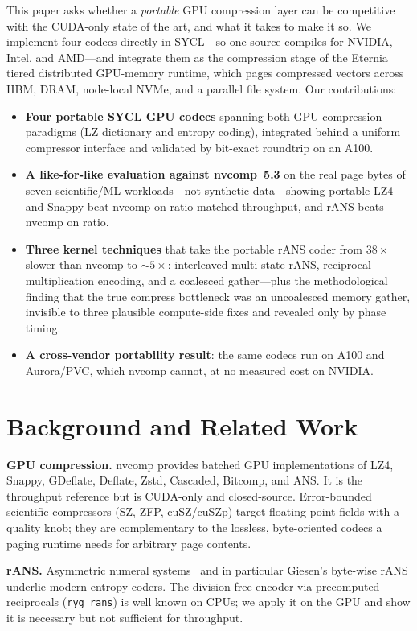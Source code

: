 \documentclass[sigconf,review,anonymous]{acmart}
\begin{document}
This paper asks whether a \emph{portable} GPU compression layer can be
competitive with the CUDA-only state of the art, and what it takes to make it so.
We implement four codecs directly in SYCL---so one source compiles for NVIDIA,
Intel, and AMD---and integrate them as the compression stage of the Eternia
tiered distributed GPU-memory runtime, which pages compressed vectors across
HBM, DRAM, node-local NVMe, and a parallel file system. Our contributions:

\begin{itemize}
\item \textbf{Four portable SYCL GPU codecs} spanning both GPU-compression
paradigms (LZ dictionary and entropy coding), integrated behind a uniform
compressor interface and validated by bit-exact roundtrip on an A100.
\item \textbf{A like-for-like evaluation against nvcomp~5.3} on the real page
bytes of seven scientific/ML workloads---not synthetic data---showing portable
LZ4 and Snappy beat nvcomp on ratio-matched throughput, and rANS beats nvcomp on
ratio.
\item \textbf{Three kernel techniques} that take the portable rANS coder from
$38\times$ slower than nvcomp to $\sim$$5\times$: interleaved multi-state rANS,
reciprocal-multiplication encoding, and a coalesced gather---plus the
methodological finding that the true compress bottleneck was an uncoalesced
memory gather, invisible to three plausible compute-side fixes and revealed only
by phase timing.
\item \textbf{A cross-vendor portability result}: the same codecs run on A100 and
Aurora/PVC, which nvcomp cannot, at no measured cost on NVIDIA.
\end{itemize}

\section{Background and Related Work}
\textbf{GPU compression.} nvcomp provides batched GPU implementations of LZ4,
Snappy, GDeflate, Deflate, Zstd, Cascaded, Bitcomp, and ANS. It is the
throughput reference but is CUDA-only and closed-source. Error-bounded
scientific compressors (SZ, ZFP, cuSZ/cuSZp) target floating-point fields with a
quality knob; they are complementary to the lossless, byte-oriented codecs a
paging runtime needs for arbitrary page contents.

\textbf{rANS.} Asymmetric numeral systems~\cite{duda2013ans} and in particular
Giesen's byte-wise rANS underlie modern entropy coders. The division-free
encoder via precomputed reciprocals (\texttt{ryg\_rans}) is well known on CPUs;
we apply it on the GPU and show it is necessary but not sufficient for
throughput.
\end{document}
